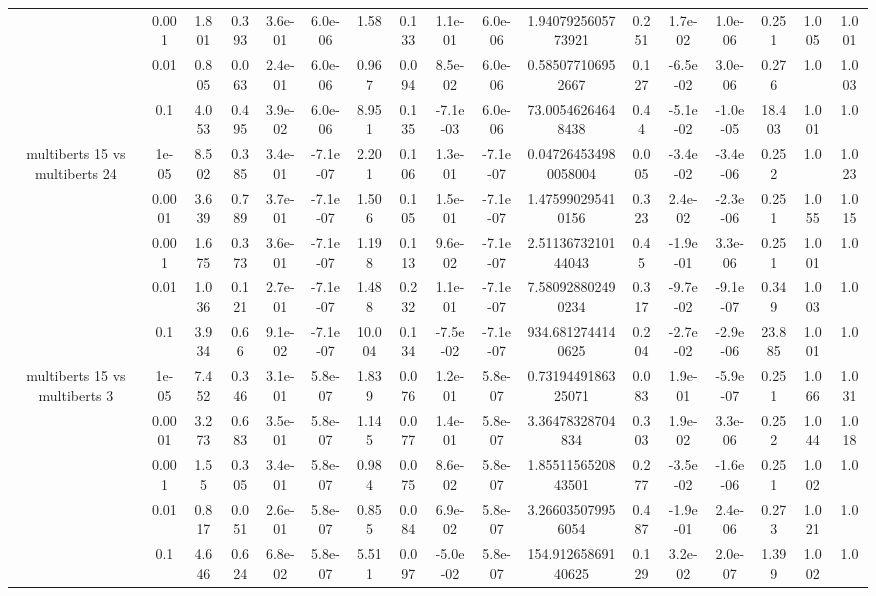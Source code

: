 \begin{tabular}{|c|c|c|c|c|c|c|c|c|c|c|c|c|c|c|c|c|}
 & 0.001 & 1.801 & 0.393 & 3.6e-01 & 6.0e-06 & 1.58 & 0.133 & 1.1e-01 & 6.0e-06 & 1.9407925605773921 & 0.251 & 1.7e-02 & 1.0e-06 & 0.251 & 1.005 & 1.001 \\
 & 0.01 & 0.805 & 0.063 & 2.4e-01 & 6.0e-06 & 0.967 & 0.094 & 8.5e-02 & 6.0e-06 & 0.585077106952667 & 0.127 & -6.5e-02 & 3.0e-06 & 0.276 & 1.0 & 1.003 \\
 & 0.1 & 4.053 & 0.495 & 3.9e-02 & 6.0e-06 & 8.951 & 0.135 & -7.1e-03 & 6.0e-06 & 73.00546264648438 & 0.44 & -5.1e-02 & -1.0e-05 & 18.403 & 1.001 & 1.0 \\
\hline
\multirow{5}{*}{multiberts 15 vs multiberts 24} & 1e-05 & 8.502 & 0.385 & 3.4e-01 & -7.1e-07 & 2.201 & 0.106 & 1.3e-01 & -7.1e-07 & 0.047264534980058004 & 0.005 & -3.4e-02 & -3.4e-06 & 0.252 & 1.0 & 1.023 \\
 & 0.0001 & 3.639 & 0.789 & 3.7e-01 & -7.1e-07 & 1.506 & 0.105 & 1.5e-01 & -7.1e-07 & 1.475990295410156 & 0.323 & 2.4e-02 & -2.3e-06 & 0.251 & 1.055 & 1.015 \\
 & 0.001 & 1.675 & 0.373 & 3.6e-01 & -7.1e-07 & 1.198 & 0.113 & 9.6e-02 & -7.1e-07 & 2.5113673210144043 & 0.45 & -1.9e-01 & 3.3e-06 & 0.251 & 1.001 & 1.0 \\
 & 0.01 & 1.036 & 0.121 & 2.7e-01 & -7.1e-07 & 1.488 & 0.232 & 1.1e-01 & -7.1e-07 & 7.580928802490234 & 0.317 & -9.7e-02 & -9.1e-07 & 0.349 & 1.003 & 1.0 \\
 & 0.1 & 3.934 & 0.66 & 9.1e-02 & -7.1e-07 & 10.004 & 0.134 & -7.5e-02 & -7.1e-07 & 934.6812744140625 & 0.204 & -2.7e-02 & -2.9e-06 & 23.885 & 1.001 & 1.0 \\
\hline
\multirow{5}{*}{multiberts 15 vs multiberts 3} & 1e-05 & 7.452 & 0.346 & 3.1e-01 & 5.8e-07 & 1.839 & 0.076 & 1.2e-01 & 5.8e-07 & 0.7319449186325071 & 0.083 & 1.9e-01 & -5.9e-07 & 0.251 & 1.066 & 1.031 \\
 & 0.0001 & 3.273 & 0.683 & 3.5e-01 & 5.8e-07 & 1.145 & 0.077 & 1.4e-01 & 5.8e-07 & 3.36478328704834 & 0.303 & 1.9e-02 & 3.3e-06 & 0.252 & 1.044 & 1.018 \\
 & 0.001 & 1.55 & 0.305 & 3.4e-01 & 5.8e-07 & 0.984 & 0.075 & 8.6e-02 & 5.8e-07 & 1.8551156520843501 & 0.277 & -3.5e-02 & -1.6e-06 & 0.251 & 1.002 & 1.0 \\
 & 0.01 & 0.817 & 0.051 & 2.6e-01 & 5.8e-07 & 0.855 & 0.084 & 6.9e-02 & 5.8e-07 & 3.266035079956054 & 0.487 & -1.9e-01 & 2.4e-06 & 0.273 & 1.021 & 1.0 \\
 & 0.1 & 4.646 & 0.624 & 6.8e-02 & 5.8e-07 & 5.511 & 0.097 & -5.0e-02 & 5.8e-07 & 154.91265869140625 & 0.129 & 3.2e-02 & 2.0e-07 & 1.399 & 1.002 & 1.0 \\

\end{tabular}
